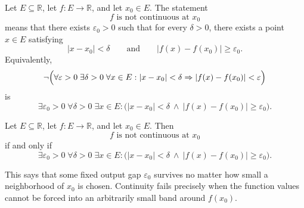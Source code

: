 \begin{definition}
\label{def:negation-continuity-at-a-point}
Let \(E \subseteq \mathbb{R}\), let \(f : E \to \mathbb{R}\), and let \(x_0 \in E\).
The statement
\[
f \text{ is not continuous at } x_0
\]
means that there exists \(\varepsilon_0>0\) such that for every \(\delta>0\), there exists a point \(x\in E\) satisfying
\[
|x-x_0|<\delta
\qquad\text{and}\qquad
|f(x)-f(x_0)|\ge \varepsilon_0.
\]
Equivalently,
\[
\neg\Bigl(
\forall \varepsilon>0\;\exists \delta>0\;\forall x\in E:
|x-x_0|<\delta \Rightarrow |f(x)-f(x_0)|<\varepsilon
\Bigr)
\]
is
\[
\exists \varepsilon_0>0\;\forall \delta>0\;\exists x\in E:
\bigl(|x-x_0|<\delta \ \wedge\ |f(x)-f(x_0)|\ge \varepsilon_0\bigr).
\]
\end{definition}

\begin{remark*}
Let \(E \subseteq \mathbb{R}\), let \(f : E \to \mathbb{R}\), and let \(x_0\in E\). Then
\[
f \text{ is not continuous at } x_0
\]
if and only if
\[
\exists \varepsilon_0>0\;\forall \delta>0\;\exists x\in E:
\bigl(|x-x_0|<\delta \ \wedge\ |f(x)-f(x_0)|\ge \varepsilon_0\bigr).
\]
\end{remark*}

\begin{remark*}[Flash]
\FlashImplies{}
\end{remark*}

\begin{remark*}[Intuition]
This says that some fixed output gap \(\varepsilon_0\) survives no matter how small a neighborhood of \(x_0\) is chosen. Continuity fails precisely when the function values cannot be forced into an arbitrarily small band around \(f(x_0)\).
\end{remark*}